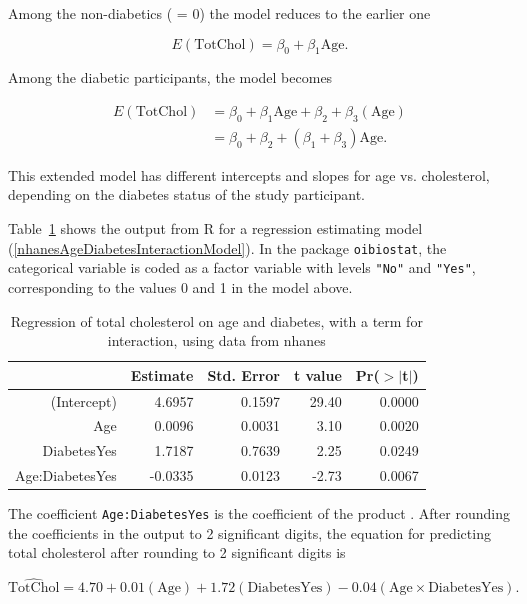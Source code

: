 Among the non-diabetics ( = 0) the model reduces to the earlier one

\[E(\text{TotChol}) = \beta_0 + \beta_1\text{Age}. \]

Among the diabetic participants, the model becomes

\begin{align*}
  E(\text{TotChol}) &= \beta_0  + \beta_1\text{Age} + \beta_2 + 
       \beta_3 (\text{Age}) \\
       & = \beta_0 + \beta_2 + (\beta_1 + \beta_3)\text{Age}.
\end{align*}

This extended model has different intercepts and slopes for age vs. cholesterol, depending on the diabetes status of the study participant. 

Table~\ref{nhanesAgeDiabetesInteraction} shows the output from \textsf{R} for a regression estimating model (\ref{nhanesAgeDiabetesInteractionModel}).  In the package \texttt{oibiostat}, the categorical variable  is coded as a factor variable with levels \texttt{"No"} and \texttt{"Yes"}, corresponding to the values 0 and 1 in the model above.

\begin{table}[ht]
\centering
\begin{tabular}{rrrrr}
  \hline
 & Estimate & Std. Error & t value & Pr($>$$|$t$|$) \\ 
  \hline
(Intercept) & 4.6957 & 0.1597 & 29.40 & 0.0000 \\ 
  Age & 0.0096 & 0.0031 & 3.10 & 0.0020 \\ 
  DiabetesYes & 1.7187 & 0.7639 & 2.25 & 0.0249 \\ 
  Age:DiabetesYes & -0.0335 & 0.0123 & -2.73 & 0.0067 \\ 
   \hline
\end{tabular}
\caption{Regression of total cholesterol on age and diabetes, 
       with a term for interaction, using data from nhanes} 
\label{nhanesAgeDiabetesInteraction}
\end{table}

The coefficient \texttt{Age:DiabetesYes} is the coefficient of the product .   After rounding the coefficients in the output to 2 significant digits, the equation for predicting total cholesterol after rounding to 2 significant digits is

\[\widehat{\text{TotChol}} = 4.70 + 0.01(\text{Age}) + 1.72(\text{DiabetesYes})
- 0.04(\text{Age} \times \text{DiabetesYes}). \]


